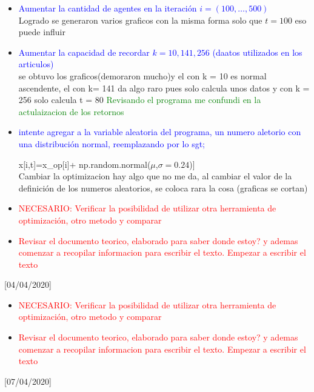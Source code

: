 \documentclass[a4paper,14pt]{article}
\begin{document}
\begin{itemize}
\item \textcolor{blue}{Aumentar la cantidad de agentes en la iteración $i=(100,\dots, 500)$}\\
Logrado se generaron varios graficos con la misma forma solo que $t=100$ eso puede influir
\item \textcolor{blue}{Aumentar la capacidad de recordar $k=10,141,256$ (daatos utilizados en los articulos)}\\
se obtuvo los graficos(demoraron mucho)y el con k = 10 es normal ascendente, el con k= 141 da algo raro pues solo calcula unos datos y con k = 256 solo calcula t = 80
\textcolor{green}{Revisando el programa me confundi en la actulaizacion de los retornos}
\item \textcolor{blue}{intente agregar a la variable aleatoria del programa, un numero aletorio con una distribución normal, reemplazando por lo sgt; }
\begin{center}
x[i,t]=x\_op[i]+ np.random.normal($\mu$,$\sigma=0.24$)]\\
\quad Cambiar la optimizacion hay algo que no me da, al cambiar el valor de la definición de los numeros aleatorios, se coloca rara la cosa (graficas se cortan) 

\end{center}

\item \textcolor{red}{NECESARIO: Verificar la posibilidad de utilizar otra herramienta de optimización, otro metodo y comparar}
\item \textcolor{red}{Revisar el documento teorico, elaborado para saber donde estoy? y ademas comenzar a recopilar informacion para escribir el texto. Empezar a escribir el texto}\\
\end{itemize}
[04/04/2020]
\begin{itemize}

\item \textcolor{red}{NECESARIO: Verificar la posibilidad de utilizar otra herramienta de optimización, otro metodo y comparar}
\item \textcolor{red}{Revisar el documento teorico, elaborado para saber donde estoy? y ademas comenzar a recopilar informacion para escribir el texto. Empezar a escribir el texto}\\
\end{itemize}
[07/04/2020]
\end{document}
